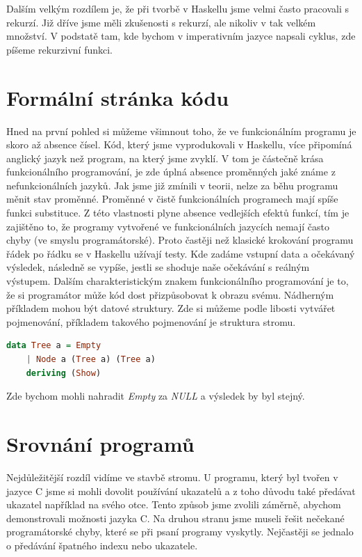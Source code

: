 \documentclass[12pt,a4paper]{report}
\begin{document}
Dalším velkým rozdílem je, že při tvorbě v Haskellu jsme velmi často pracovali s rekurzí. Již dříve jsme měli zkušenosti s rekurzí, ale nikoliv v tak velkém množství. V podstatě tam, kde bychom v imperativním jazyce napsali cyklus, zde píšeme rekurzivní funkci. 

\section{Formální stránka kódu}
Hned na první pohled si můžeme všimnout toho, že ve funkcionálním programu je skoro až absence čísel. Kód, který jsme vyprodukovali v Haskellu, více připomíná anglický jazyk než program, na který jsme zvyklí. V tom je částečně krása funkcionálního programování, je zde úplná absence proměnných jaké známe z nefunkcionálních jazyků. Jak jsme již zmínili v teorii, nelze za běhu programu měnit stav proměnné. Proměnné v čistě funkcionálních programech mají spíše funkci substituce. Z této vlastnosti plyne absence vedlejších efektů funkcí, tím je zajištěno to, že programy vytvořené ve funkcionálních jazycích nemají často chyby (ve smyslu programátorské). Proto častěji než klasické krokování programu řádek po řádku se v Haskellu užívají testy. Kde zadáme vstupní data a očekávaný výsledek, následně se vypíše, jestli se shoduje naše očekávání s reálným výstupem.  
\newpage
Dalším charakteristickým znakem funkcionálního programování je to, že si programátor může kód dost přizpůsobovat k obrazu svému. Nádherným příkladem mohou být datové struktury. Zde si můžeme podle libosti vytvářet pojmenování, příkladem takového pojmenování je struktura stromu.
\begin{lstlisting}[language=Haskell, caption={Definice datového typu Tree}, captionpos=b,]
data Tree a = Empty
    | Node a (Tree a) (Tree a)
    deriving (Show)
\end{lstlisting}

Zde bychom mohli nahradit \textit{Empty} za \textit{NULL} a výsledek by byl stejný.    
\section{Srovnání programů}
Nejdůležitější rozdíl vidíme ve stavbě stromu. U programu, který byl tvořen v jazyce C jsme si mohli dovolit používání ukazatelů a z toho důvodu také předávat ukazatel například na svého otce. Tento způsob jsme zvolili záměrně, abychom demonstrovali možnosti jazyka C. Na druhou stranu jsme museli řešit nečekané programátorské chyby, které se při psaní programy vyskytly. Nejčastěji se jednalo o předávání špatného indexu nebo ukazatele. 
\end{document}
